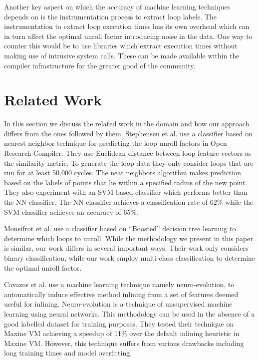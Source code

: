 \documentclass[]{sig-alternate}
\begin{document}
Another key aspect on which the accuracy of machine learning techniques depends on is the instrumentation process to extract loop labels. The instrumentation to extract loop execution times has its own overhead which can in turn affect the optimal unroll factor introducing noise in the data. One way to counter this would be to use libraries which extract execution times without making use of intrusive system calls. These can be made available within the compiler infrastructure for the greater good of the community.

\section{Related Work}
\label{sec:RelatedWork}
In this section we discuss the related work in the domain and how our approach differs from the ones followed by them.
Stephensen et al. use a classifier based on nearest neighbor technique for predicting the loop unroll factors in Open Research Compiler. They use Euclidean distance between loop feature vectors as the similarity metric. To generate the loop data they only consider loops that are run for at least 50,000 cycles. The near neighbors algorithm makes prediction based on the labels of points that lie within a specified radius of the new point. They also experiment with an SVM based classifier which performs better than the NN classifier. The NN classifier achieves a classification rate of 62\% while the SVM classifier achieves an accuracy of 65\%. 

Monsifrot et al. use a classifier based on ``Boosted'' decision tree learning to determine which loops to unroll. While the methodology we present in this paper is similar, our work differs in several important ways. Their work only considers binary classification, while our work employ multi-class classification to determine the optimal unroll factor. 

Cavazos et  al. use a machine learning technique namely neuro-evolution, to automatically induce effective method inlining from a set of features deemed useful for inlining. Neuro-evolution is a technique of unsupervised machine learning using neural networks. This methodology can be used in the absence of a good labelled dataset for training purposes. They tested their technique on Maxine VM achieving a speedup of 11\% over the default inlining heuristic in Maxine VM. However, this technique suffers from various drawbacks including long training times and model overfitting.
\end{document}
